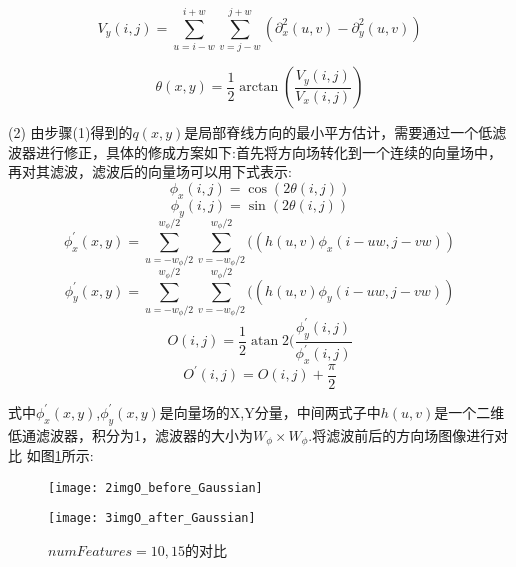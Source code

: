 \documentclass[withoutpreface,bwprint]{cumcmthesis} %
\begin{document}
\begin{equation}
V_{y}(i, j)=\sum_{u=i-w}^{i+w} \sum_{v=j-w}^{j+w}\left(\partial_{x}^{2}(u, v)-\partial_{y}^{2}(u, v)\right) 
\end{equation}

\begin{equation}
\theta(x, y)=\frac{1}{2} \arctan \left(\frac{V_{y}(i, j)}{V_{x}(i, j)}\right)
\end{equation}


(2) 由步骤(1)得到的$q$$(x,y)$是局部脊线方向的最小平方估计，需要通过一个低滤波器进行修正，具体的修成方案如下:首先将方向场转化到一个连续的向量场中，再对其滤波，滤波后的向量场可以用下式表示:
\begin{equation}
\phi_{x}(i, j)=\cos (2 \theta(i, j)) 
\end{equation}
\begin{equation}
\phi_{y}(i, j)=\sin (2 \theta(i, j)) 
\end{equation}
\begin{equation}
\phi_{x}^{\prime}(x, y)=\sum_{u=-w_{\phi} / 2}^{w_{\phi} / 2} \sum_{v=-w_{\phi} / 2}^{w_{\phi} / 2}((h(u, v) \phi_{x}(i-u w, j-vw))
\end{equation}
\begin{equation}
\phi_{y}^{\prime}(x, y)=\sum_{u=-w_{\phi} / 2}^{w_{\phi} / 2} \sum_{v=-w_{\phi} / 2}^{w_{\phi} / 2}((h(u, v) \phi_{y}(i-u w, j-vw))
\end{equation}
\begin{equation}
O(i, j)=\frac{1}{2} \operatorname{atan} 2(\frac{\phi_{y}^{\prime}(i,j)}{\phi_{x}^{\prime}(i,j)} 
\end{equation}
\begin{equation}
O^{\prime}(i, j)=O(i, j)+\frac{\pi}{2}
\end{equation}

式中$\phi_{x}^{\prime}(x, y)$,$\phi_{y}^{\prime}(x, y)$是向量场的X,Y分量，中间两式子中$h$$(u,v)$是一个二维低通滤波器，积分为1，滤波器的大小为$W_{\phi}\times W_{\phi}$.将滤波前后的方向场图像进行对比 如图\ref{fig:Gaussian}所示:

\begin{figure}[!h]
    \centering
    \begin{minipage}[c]{0.45\textwidth}
        \centering
        \texttt{[image: 2imgO\_before\_Gaussian]}
        \label{fig:2imgO_before_Gaussian}
    \end{minipage}
    \begin{minipage}[c]{0.45\textwidth}
        \centering
        \texttt{[image: 3imgO\_after\_Gaussian]}
        \label{fig:3imgO_after_Gaussian}
    \end{minipage}
	\caption{$numFeatures=10,15$的对比}
	\label{fig:Gaussian}
  \end{figure}
\end{document}

